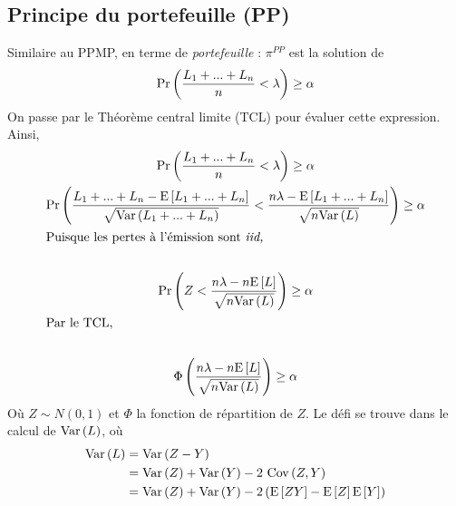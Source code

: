 \documentclass[10pt, french]{article}
\begin{document}
\begin{multicols*}{3}
\subsection{Principe du portefeuille (PP)}
Similaire au PPMP, en terme de \emph{portefeuille} : $\pi^{PP}$ est la solution de
\begin{align*}
\Pr \left( \frac{L_1 + ... + L_n}{n} < \lambda \right) \geq \alpha
\end{align*}
On passe par le Théorème central limite (TCL) pour évaluer cette expression. Ainsi,
\begin{gather*}
\Pr \left( \frac{L_1 + ...  + L_n}{n} <\lambda \right)  \geq \alpha \\
\Pr \left( \frac{L_1 + ... + L_n - \mathrm{E} \left[ L_1 + ... + L_n \right]}{\sqrt{\mathrm{Var} \left( L_1 + ... + L_n \right)}} < \frac{n \lambda - \mathrm{E} \left[ L_1 + ... + L_n \right]}{\sqrt{n \mathrm{Var} \left( L \right)}}   \right)  \geq \alpha \\
\shortintertext{Puisque les pertes à l'émission sont \emph{iid,}} \\
\Pr \left( Z < \frac{n \lambda - n \mathrm{E} \left[ L \right]}{\sqrt{n \mathrm{Var} \left( L \right)}} \right)  \geq \alpha \\
\shortintertext{Par le TCL,} \\
\Phi \left( \frac{n \lambda - n \mathrm{E} \left[ L \right]}{\sqrt{n \mathrm{Var} \left( L \right)}} \right)  \geq \alpha \\
\end{gather*}
Où $Z \sim N(0,1)$ et $\Phi$ la fonction de répartition de $Z$. Le défi se trouve dans le calcul de $\mathrm{Var} \left( L \right)$, où
\begin{align*}
\mathrm{Var} \left( L \right)	& = \mathrm{Var} \left( Z - Y \right) \\
& = \mathrm{Var} \left( Z \right) + \mathrm{Var} \left( Y \right) - 2 \  \mathrm{Cov} \left( Z, Y \right) \\
& = \mathrm{Var} \left( Z \right)  + \mathrm{Var} \left( Y \right) - 2 \left( \mathrm{E} \left[ ZY \right] - \mathrm{E} \left[ Z \right] \mathrm{E} \left[ Y \right] \right) \\
\end{align*}


\end{multicols*}
\end{document}
